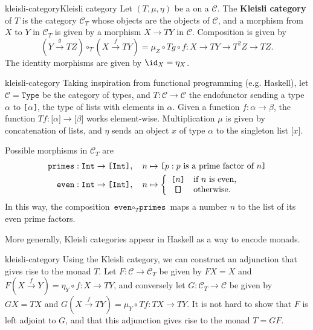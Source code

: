 \begin{topic}{kleisli-category}{Kleisli category}
    Let $(T, \mu, \eta)$ be a  on a  $\mathcal{C}$. The \textbf{Kleisli category} of $T$ is the category $\mathcal{C}_T$ whose objects are the objects of $\mathcal{C}$, and a morphism from $X$ to $Y$ in $\mathcal{C}_T$ is given by a morphism $X \to TY$ in $\mathcal{C}$. Composition is given by
    \[ (Y \xrightarrow{g} TZ) \circ_T (X \xrightarrow{f} TY) = \mu_Z \circ Tg \circ f : X \to TY \to T^2 Z \to TZ . \]
    The identity morphisms are given by $\id_X = \eta_X$.
\end{topic}

\begin{example}{kleisli-category}
    Taking inspiration from functional programming (e.g. Haskell), let $\mathcal{C} = \texttt{Type}$ be the category of types, and $T : \mathcal{C} \to \mathcal{C}$ the endofunctor sending a type $\alpha$ to \texttt{[$\alpha$]}, the type of lists with elements in $\alpha$. Given a function $f : \alpha \to \beta$, the function $Tf : \texttt{[}\alpha\texttt{]} \to \texttt{[}\beta\texttt{]}$ works element-wise.
    Multiplication $\mu$ is given by concatenation of lists, and $\eta$ sends an object $x$ of type $\alpha$ to the singleton list $\texttt{[}x\texttt{]}$.
    
    Possible morphisms in $\mathcal{C}_T$ are
    \[ \begin{aligned}
        \texttt{primes} &: \texttt{Int} \to \texttt{[Int]}, \quad n \mapsto \texttt{[}p : p \textup{ is a prime factor of } n\texttt{]} \\
        \texttt{even} &: \texttt{Int} \to \texttt{[Int]}, \quad n \mapsto \left\{ \begin{array}{cl}
         \texttt{[$n$]} & \text{if $n$ is even,} \\
         \texttt{[]} & \text{otherwise.} \end{array} \right.
    \end{aligned} \]
    In this way, the composition $\texttt{even} \circ_T \texttt{primes}$ maps a number $n$ to the list of its even prime factors.
    
    More generally, Kleisli categories appear in Haskell as a way to encode monads.
\end{example}

\begin{example}{kleisli-category}
    Using the Kleisli category, we can construct an adjunction that gives rise to the monad $T$. Let $F : \mathcal{C} \to \mathcal{C}_T$ be given by $FX = X$ and $F(X \xrightarrow{f} Y) = \eta_Y \circ f : X \to TY$, and conversely let $G : \mathcal{C}_T \to \mathcal{C}$ be given by $GX = TX$ and $G(X \xrightarrow{f} TY) = \mu_Y \circ Tf : TX \to TY$. It is not hard to show that $F$ is left adjoint to $G$, and that this adjunction gives rise to the monad $T = GF$.
\end{example}

